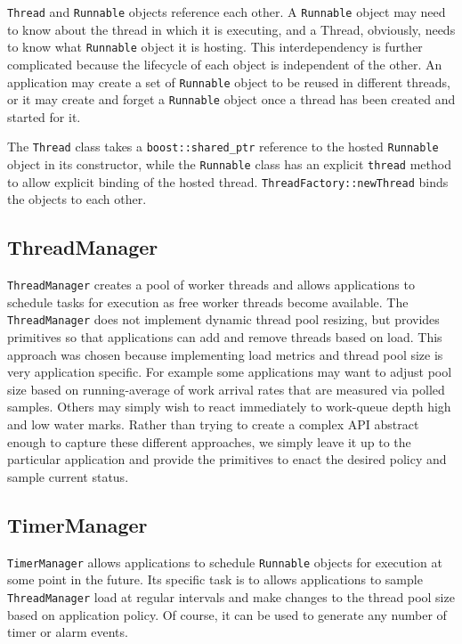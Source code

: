 \documentclass[nocopyrightspace,blockstyle]{sigplanconf}
\begin{document}
\texttt{Thread} and \texttt{Runnable} objects reference each other. A \texttt{Runnable}
object may need to know about the thread in which it is executing, and a Thread, obviously,
needs to know what \texttt{Runnable} object it is hosting. This interdependency is
further complicated because the lifecycle of each object is independent of the
other. An application may create a set of \texttt{Runnable} object to be reused in different threads, or it may create and forget a \texttt{Runnable} object
once a thread has been created and started for it.

The \texttt{Thread} class takes a \texttt{boost::shared\_ptr} reference to the hosted
\texttt{Runnable} object in its constructor, while the \texttt{Runnable} class has an
explicit \texttt{thread} method to allow explicit binding of the hosted thread.
\texttt{ThreadFactory::newThread} binds the objects to each other.

\subsection{ThreadManager}

\texttt{ThreadManager} creates a pool of worker threads and
allows applications to schedule tasks for execution as free worker threads
become available. The \texttt{ThreadManager} does not implement dynamic
thread pool resizing, but provides primitives so that applications can add
and remove threads based on load. This approach was chosen because
implementing load metrics and thread pool size is very application
specific. For example some applications may want to adjust pool size based
on running-average of work arrival rates that are measured via polled
samples. Others may simply wish to react immediately to work-queue
depth high and low water marks. Rather than trying to create a complex
API abstract enough to capture these different approaches, we
simply leave it up to the particular application and provide the
primitives to enact the desired policy and sample current status.

\subsection{TimerManager}

\texttt{TimerManager} allows applications to schedule
 \texttt{Runnable} objects for execution at some point in the future. Its specific task
is to allows applications to sample \texttt{ThreadManager} load at regular
intervals and make changes to the thread pool size based on application policy.
Of course, it can be used to generate any number of timer or alarm events.
\end{document}
